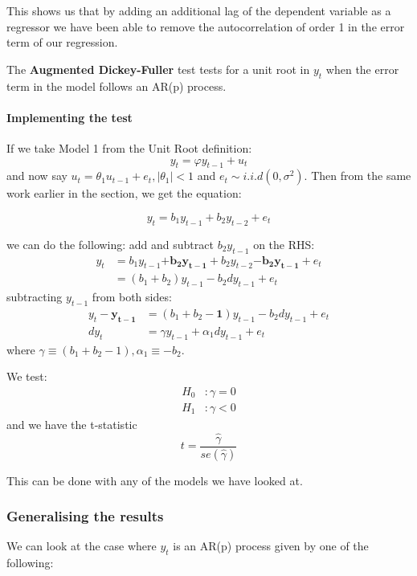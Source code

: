 \documentclass[11pt]{article}
\begin{document}
This shows us that by adding an additional lag of the dependent variable as a regressor we have been able to remove the autocorrelation of order 1 in the error term of our regression. 
 
The \textbf{Augmented Dickey-Fuller} test tests for a unit root in $y_t$ when the error term in the model follows an AR(p) process.

\begin{mdframed}
\paragraph{Implementing the test} \mbox{}

If we take Model 1 from the Unit Root definition:
\[y_t = \varphi y_{t-1} + u_t\]
and now say $u_t = \theta_1 u_{t-1} + e_t, |\theta_1|<1$ and $e_t\sim i.i.d(0,\sigma^2)$. Then from the same work earlier in the section, we get the equation:

\[y_t = b_1 y_{t-1} + b_2 y_{t-2} + e_t\]

we can do the following:
add and subtract $b_2 y_{t-1}$ on the RHS:
\begin{align*}
    y_t &= b_1 y_{t-1} \boldsymbol{+ b_2 y_{t-1}}+ b_2 y_{t-2} \boldsymbol{- b_2 y_{t-1}} + e_t \\
    &= (b_1 + b_2) y_{t-1} - b_2 dy_{t-1} + e_t
\end{align*}
subtracting $y_{t-1}$ from both sides:
\begin{align*}
    y_t - \boldsymbol{y_{t-1}} &= (b_1 + b_2 - \boldsymbol{1})y_{t-1} - b_2 dy_{t-1} + e_t \\
    dy_t &= \gamma y_{t-1} + \alpha_1 dy_{t-1} + e_t
\end{align*}
where $ \gamma \equiv (b_1+b_2-1), \alpha_1 \equiv -b_2$.

We test:
\begin{align*}
    H_0&: \gamma = 0 \\
    H_1&: \gamma < 0
\end{align*}
and we have the t-statistic
\[t = \dfrac{\hat{\gamma}}{se(\hat{\gamma})}\]

This can be done with any of the models we have looked at.
\end{mdframed}

\subsubsection{Generalising the results}

We can look at the case where $y_t$ is an AR(p) process given by one of the following:
\end{document}
